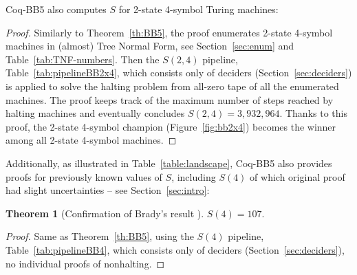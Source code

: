 \documentclass[sigconf,screen]{acmart}
\theoremstyle{definition} %
\newtheorem{theorem}{Theorem}[section]
\numberwithin{equation}{section}
\theoremstyle{definition} %
\newcommand{\BBtheFourth}{107}
\newcommand{\BBTxF}{3{,}932{,}964}
\newcommand{\CoqBB}{Coq-BB5\xspace}
\begin{document}
\CoqBB also computes $S$ for 2-state 4-symbol Turing machines:

\thBBTxF*

\begin{proof}
    Similarly to Theorem~\ref{th:BB5}, the \Coq proof enumerates 2-state 4-symbol machines in (almost) Tree Normal Form, see Section~\ref{sec:enum} and Table~\ref{tab:TNF-numbers}. Then the $S(2,4)$ pipeline, Table~\ref{tab:pipelineBB2x4}, which consists only of deciders (Section~\ref{sec:deciders}) is applied to solve the halting problem from all-zero tape of all the enumerated machines. The proof keeps track of the maximum number of steps reached by halting machines and eventually concludes $S(2,4) = \BBTxF$. Thanks to this proof, the 2-state 4-symbol champion (Figure~\ref{fig:bb2x4}) becomes the winner among all 2-state 4-symbol machines.
\end{proof}

Additionally, as illustrated in Table~\ref{table:landscape}, \CoqBB also provides \Coq proofs for previously known values of $S$, including $S(4)$ of which original proof \cite{Brady83} had slight uncertainties -- see Section~\ref{sec:intro}:

\begin{theorem}[Confirmation of Brady's result \cite{Brady83}]\label{th:BB4}
    $S(4) = \BBtheFourth$.
\end{theorem}
\begin{proof}
    Same as Theorem~\ref{th:BB5}, using the $S(4)$ pipeline, Table~\ref{tab:pipelineBB4}, which consists only of deciders (Section~\ref{sec:deciders}), \ie no individual proofs of nonhalting.
\end{proof}

\newpage
\end{document}
